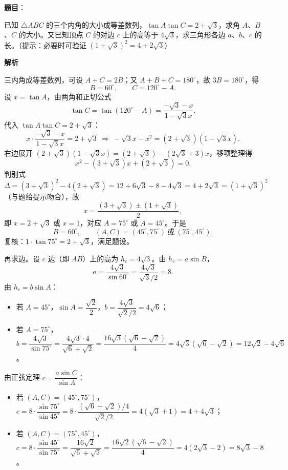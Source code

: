 \begin{answer}

\textbf{题目}：

已知 $\triangle ABC$ 的三个内角的大小成等差数列，$\tan A\tan C=2+\sqrt3$，求角 $A$、$B$、$C$ 的大小。又已知顶点 $C$ 的对边 $c$ 上的高等于 $4\sqrt3$，求三角形各边 $a$、$b$、$c$ 的长。（提示：必要时可验证 $(1+\sqrt3)^2=4+2\sqrt3$）

\textbf{解析}

三内角成等差数列，可设 $A+C=2B$；又 $A+B+C=180^\circ$，故 $3B=180^\circ$，得
\nopagebreak[4]
\[
B=60^\circ,\qquad C=120^\circ-A.
\]
设 $x=\tan A$，由两角和正切公式
\nopagebreak[4]
\[
\tan C=\tan(120^\circ-A)=\frac{-\sqrt3-x}{1-\sqrt3x}.
\]
代入 $\tan A\tan C=2+\sqrt3$：
\nopagebreak[4]
\[
x\cdot\frac{-\sqrt3-x}{1-\sqrt3x}=2+\sqrt3
\ \Longrightarrow\ -\sqrt3x-x^2=(2+\sqrt3)(1-\sqrt3x).
\]
右边展开 $(2+\sqrt3)(1-\sqrt3x)=(2+\sqrt3)-(2\sqrt3+3)x$，移项整理得
\nopagebreak[4]
\[
x^2-(3+\sqrt3)x+(2+\sqrt3)=0.
\]
判别式
\nopagebreak[4]
\[
\Delta=(3+\sqrt3)^2-4(2+\sqrt3)=12+6\sqrt3-8-4\sqrt3=4+2\sqrt3=(1+\sqrt3)^2
\]
（与题给提示吻合），故
\nopagebreak[4]
\[
x=\frac{(3+\sqrt3)\pm(1+\sqrt3)}{2},
\]
即 $x=2+\sqrt3$ 或 $x=1$，对应 $A=75^\circ$ 或 $A=45^\circ$。于是
\nopagebreak[4]
\[
B=60^\circ,\qquad (A,C)=(45^\circ,75^\circ)\ \text{或}\ (75^\circ,45^\circ).
\]
复核：$1\cdot\tan75^\circ=2+\sqrt3$，满足题设。

再求边。设 $c$ 边（即 $AB$）上的高为 $h_c=4\sqrt3$。由 $h_c=a\sin B$，
\nopagebreak[4]
\[
a=\frac{4\sqrt3}{\sin60^\circ}=\frac{4\sqrt3}{\sqrt3/2}=8.
\]
由 $h_c=b\sin A$：
\begin{itemize}
\item 若 $A=45^\circ$，$\sin A=\dfrac{\sqrt2}{2}$，$b=\dfrac{4\sqrt3}{\sqrt2/2}=4\sqrt6$；
\item 若 $A=75^\circ$，$b=\dfrac{4\sqrt3}{\sin75^\circ}=\dfrac{4\sqrt3\cdot4}{\sqrt6+\sqrt2}=\dfrac{16\sqrt3(\sqrt6-\sqrt2)}{4}=4\sqrt3(\sqrt6-\sqrt2)=12\sqrt2-4\sqrt6$。
\end{itemize}

由正弦定理 $c=\dfrac{a\sin C}{\sin A}$：
\begin{itemize}
\item 若 $(A,C)=(45^\circ,75^\circ)$，$c=8\cdot\dfrac{\sin75^\circ}{\sin45^\circ}=8\cdot\dfrac{(\sqrt6+\sqrt2)/4}{\sqrt2/2}=4(\sqrt3+1)=4+4\sqrt3$；
\item 若 $(A,C)=(75^\circ,45^\circ)$，$c=8\cdot\dfrac{\sin45^\circ}{\sin75^\circ}=\dfrac{16\sqrt2}{\sqrt6+\sqrt2}=\dfrac{16\sqrt2(\sqrt6-\sqrt2)}{4}=4(2\sqrt3-2)=8\sqrt3-8$。
\end{itemize}


\end{answer}
